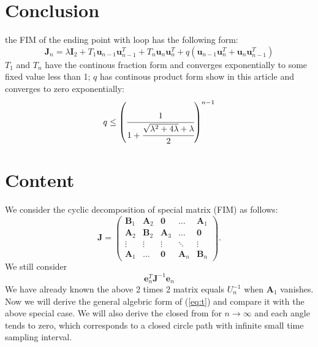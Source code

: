 \documentclass[12pt]{article}
\begin{document}
\section{Conclusion}
the FIM of the ending point with loop has the following form:
\[
\bm{J}_n=\lambda\bm{I}_2+T_1\bm{u}_{n-1}\bm{u}_{n-1}^T+T_n\bm{u}_n\bm{u}_n^T+q(\bm{u}_{n-1}\bm{u}_{n}^T+\bm{u}_{n}\bm{u}_{n-1}^T)
\]
$T_1$ and $T_n$ have the continous fraction form and converges exponentially to some fixed value less than 1;
$q$ has continous product form show in this article and converges to zero exponentially:
\begin{equation}
q\leq \left(\cfrac{1}{1+\cfrac{\sqrt{\lambda^2+4\lambda}+\lambda}{2}}\right)^{n-1}
\end{equation}
\section{Content}
We consider the cyclic decomposition of special matrix (FIM) as follows:
\begin{equation}
\bm{J}=\begin{pmatrix}
                 \bm{B}_1 & \bm{A}_2 & \bm{0} & \dots & \bm{A}_1 \\
                 \bm{A}_2 & \bm{B}_2 & \bm{A}_3 & \dots & \bm{0} \\
                 \vdots & \vdots & \vdots & \ddots & \vdots \\
                 \bm{A}_1 & \dots & \bm{0} & \bm{A}_{n} & \bm{B}_{n}
               \end{pmatrix}.
\end{equation}
We still consider 
\begin{equation}\label{eq:t}
\bm{e}_{n}^{T}\bm{J}^{-1}\bm{e}_{n}
\end{equation}
We have already known the above 2 times 2 matrix equals $U_{n}^{-1}$ when $\bm{A}_1$ vanishes.
Now we will derive the general algebric form of (\ref{eq:t}) and compare it with the above special case.
We will also derive the closed from for $n\to \infty$ and each angle tends to zero, which corresponds to a closed circle
path with infinite small time sampling interval.
\end{document}

